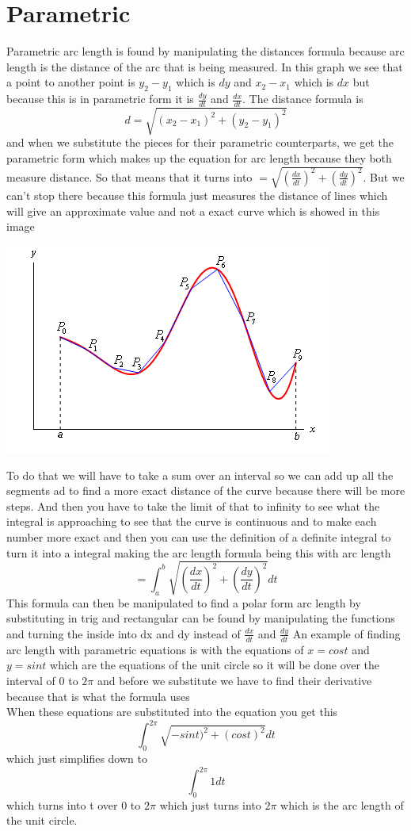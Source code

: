 \documentclass[a4paper,openright, 14pt]{article}
\begin{document}
\section*{Parametric}
Parametric arc length is found by manipulating the distances formula because arc length is the distance of the arc that is being measured. In this graph we see that a point to another point is $y_2-y_1$ which is $dy$ and $x_2-x_1$ which is $dx$ but because this is in parametric form it is $\frac{dy}{dt}$ and $\frac{dx}{dt}$. The distance formula is $$d=\sqrt{(x_2-x_1)^2+(y_2-y_1)^2}$$ and when we substitute the pieces for their parametric counterparts, we get the parametric form which makes up the equation for arc length because they both measure distance. So that means that it turns into $=\sqrt{(\frac{dx}{dt})^2+(\frac{dy}{dt})^2}$. But we can't stop there because this formula just measures the distance of lines which will give an approximate value and not a exact curve which is showed in this image \begin{center}
\includegraphics[width = 7 cm, height = 5 cm]{arclength.png}
\end{center}
To do that we will have to take a sum over an interval so we can add up all the segments ad to find a more exact distance of the curve because there will be more steps. And then you have to take the limit of that to infinity to see what the integral is approaching to see that the curve is continuous and to make each number more exact and then you can use the definition of a definite integral to turn it into a integral making the arc length formula being this with arc length $$=\int_{a}^{b}\sqrt{(\frac{dx}{dt})^2+(\frac{dy}{dt})^2}dt$$ This formula can then be manipulated to find a polar form arc length by substituting in trig and rectangular can be found by manipulating the functions and turning the inside into dx and dy instead of $\frac{dx}{dt}$ and $\frac{dy}{dt}$  
An example of finding arc length with parametric equations is with the equations of $x=cost$ and $y=sint$ which are the equations of the unit circle so it will be done over the interval of 0 to $2\pi$ and before we substitute we have to find their derivative because that is what the formula uses \\When these equations are substituted into the equation you get this $$\int_{0}^{2\pi}\sqrt{-sint)^2+(cost)^2}dt$$ which just simplifies down to $$\int_{0}^{2\pi}1dt$$ which turns into t over 0 to $2\pi$ which just turns into $2\pi$ which is the arc length of the unit circle.
\end{document}

